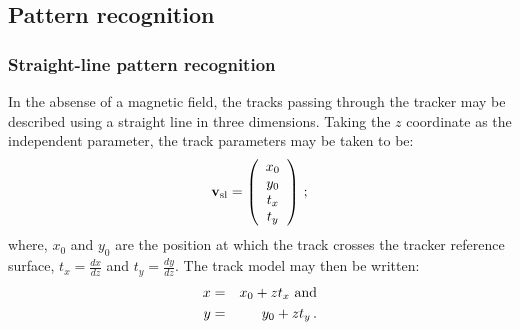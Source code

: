 \subsection{Pattern recognition}
\label{Sect:PatRec}

\subsubsection{Straight-line pattern recognition}
\label{SubSect:SLPatRec}

In the absense of a magnetic field, the tracks passing through the
tracker may be described using a straight line in three dimensions.
Taking the $z$ coordinate as the independent parameter, the track
parameters may be taken to be:
\begin{equation}
 {\bf v_{\rm sl}} =
 \left( 
   \begin{array}{c}
     x_0 \\
     y_0 \\
     t_x \\
     t_y
   \end{array}
 \right)\,;
\end{equation}
where, $x_0$ and $y_0$ are the position at which the track crosses the
tracker reference surface, $t_x = \frac{dx}{dz}$ and 
$t_y = \frac{dy}{dz}$. 
The track model may then be written:
\begin{eqnarray}
  x & = & x_0 + z t_x {\rm~and} \\
  y & = & y_0 + z t_y \,.
\end{eqnarray}

